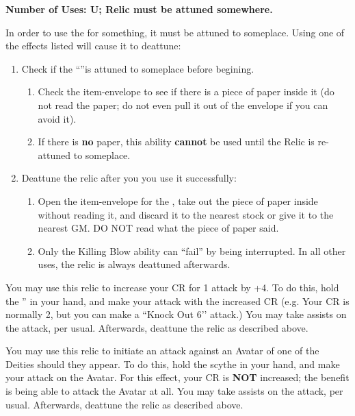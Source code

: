 \documentclass[green]{GL2020}
\begin{document}
\name{\gDeathRelic{}}

\textbf{Number of Uses: U; Relic must be attuned somewhere.}

In order to use the \iScythe for something, it must be attuned to someplace. Using one of the effects listed will cause it to deattune:
\begin{enumerate}
  \item Check if the ``\iScythe{}''is attuned to someplace before begining.
  \begin{enumerate}
    \item Check the item-envelope to see if there is a piece of paper inside it (do not read the paper; do not even pull it out of the envelope if you can avoid it).
    \item If there is \textbf{no} paper, this ability \textbf{cannot} be used until the Relic is re-attuned to someplace.
  \end{enumerate}
  \item Deattune the relic after you you use it successfully:
  \begin{enumerate}
    \item Open the item-envelope for the \iScythe{}, take out the piece of paper inside without reading it, and discard it to the nearest stock or give it to the nearest GM. DO NOT read what the piece of paper said.
    \item Only the Killing Blow ability can ``fail'' by being interrupted. In all other uses, the relic is always deattuned afterwards.
    \end{enumerate}
\end{enumerate}

You may use this relic to increase your CR for 1 attack by +4. To do this, hold the \iScythe{}'' in your hand, and make your attack with the increased CR (e.g. Your CR is normally 2, but you can make a ``Knock Out 6’’ attack.) You may take assists on the attack, per usual. Afterwards, deattune the relic as described above.

You may use this relic to initiate an attack against an Avatar of one of the Deities should they appear. To do this, hold the scythe in your hand, and make your attack on the Avatar. For this effect, your CR is \textbf{NOT} increased; the benefit is being able to attack the Avatar at all. You may take assists on the attack, per usual. Afterwards, deattune the relic as described above.
\end{document}
